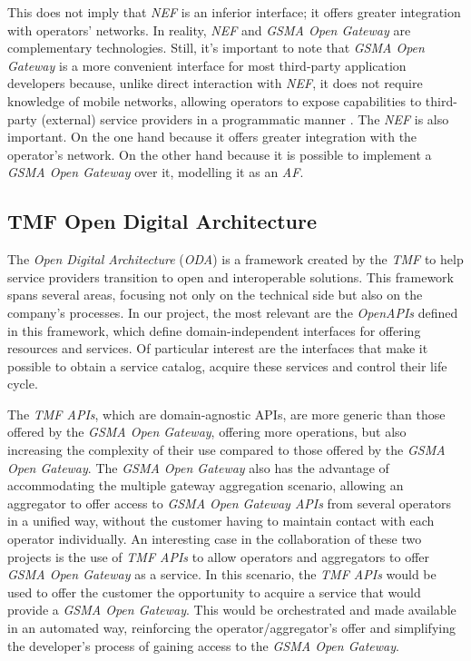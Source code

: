 This does not imply that \emph{NEF} is an inferior interface; it offers greater
integration with operators' networks. In reality, \emph{NEF} and \emph{GSMA
	Open Gateway} are complementary technologies. Still, it's important to note
that \emph{GSMA Open Gateway} is a more convenient interface for most
third-party application developers because, unlike direct interaction with
\emph{NEF},  it does not require knowledge of mobile networks, allowing
operators to expose capabilities to third-party (external) service providers in
a programmatic manner \cite{5gamericas}. The \emph{NEF} is also important. On
the one hand because it offers greater integration with the operator's network.
On the other hand because it is possible to implement a \emph{GSMA Open Gateway} over
it, modelling it as an \emph{AF}.

\subsection{TMF Open Digital Architecture}

The \emph{Open Digital Architecture} (\emph{ODA}) is a framework created by the
\emph{TMF} to help service providers transition to open and interoperable
solutions. This framework spans several areas, focusing not only on the
technical side but also on the company's processes. In our project, the most
relevant are the \emph{OpenAPIs} defined in this framework, which define
domain-independent interfaces for offering resources and services. Of
particular interest are the interfaces that make it possible to obtain a
service catalog, acquire these services and control their life cycle.

The \emph{TMF APIs}, which are domain-agnostic APIs, are more generic than
those offered by the \emph{GSMA Open Gateway}, offering more operations, but
also increasing the complexity of their use compared to those offered by the
\emph{GSMA Open Gateway}. The \emph{GSMA Open Gateway} also has the advantage
of accommodating the multiple gateway aggregation scenario, allowing an
aggregator to offer access to \emph{GSMA Open Gateway APIs} from several
operators in a unified way, without the customer having to maintain contact
with each operator individually. An interesting case in the collaboration of
these two projects is the use of \emph{TMF APIs} to allow operators and
aggregators to offer \emph{GSMA Open Gateway} as a service. In this scenario,
the \emph{TMF APIs} would be used to offer the customer the opportunity to
acquire a service that would provide a \emph{GSMA Open Gateway}. This would be
orchestrated and made available in an automated way, reinforcing the
operator/aggregator's offer and simplifying the developer's process of gaining
access to the \emph{GSMA Open Gateway}.


